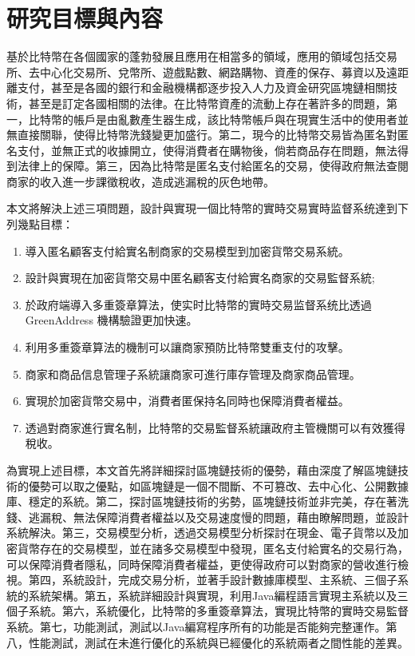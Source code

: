 		

	\section{研究目標與內容}
	基於比特幣在各個國家的蓬勃發展且應用在相當多的領域，應用的領域包括交易所、去中心化交易所、兌幣所、遊戲點數、網路購物、資產的保存、募資以及遠距離支付，甚至是各國的銀行和金融機構都逐步投入人力及資金研究區塊鏈相關技術，甚至是訂定各國相關的法律。在比特幣資產的流動上存在著許多的問題，第一，比特幣的帳戶是由亂數產生器生成，該比特幣帳戶與在現實生活中的使用者並無直接關聯，使得比特幣洗錢變更加盛行。第二，現今的比特幣交易皆為匿名對匿名支付，並無正式的收據開立，使得消費者在購物後，倘若商品存在問題，無法得到法律上的保障。第三，因為比特幣是匿名支付給匿名的交易，使得政府無法查閱商家的收入進一步課徵稅收，造成逃漏稅的灰色地帶。

	本文將解決上述三項問題，設計與實現一個比特幣的實時交易實時监督系统達到下列幾點目標：

		\begin{enumerate}
			\item 導入匿名顧客支付給實名制商家的交易模型到加密貨幣交易系統。
			\item 設計與實現在加密貨幣交易中匿名顧客支付給實名商家的交易監督系統;
			\item 於政府端導入多重簽章算法，使实时比特幣的實時交易监督系统比透過 GreenAddress 機構驗證更加快速。
			\item 利用多重簽章算法的機制可以讓商家預防比特幣雙重支付的攻擊。
			\item 商家和商品信息管理⼦系統讓商家可進行庫存管理及商家商品管理。
			\item 實現於加密貨幣交易中，消費者匿保持名同時也保障消費者權益。
			\item 透過對商家進行實名制，比特幣的交易監督系統讓政府主管機關可以有效獲得稅收。
		\end{enumerate}

	為實現上述目標，本文首先將詳細探討區塊鏈技術的優勢，藉由深度了解區塊鏈技術的優勢可以取之優點，如區塊鏈是一個不間斷、不可篡改、去中心化、公開數據庫、穩定的系統。第二，探討區塊鏈技術的劣勢，區塊鏈技術並非完美，存在著洗錢、逃漏稅、無法保障消費者權益以及交易速度慢的問題，藉由瞭解問題，並設計系統解決。第三，交易模型分析，透過交易模型分析探討在現金、電子貨幣以及加密貨幣存在的交易模型，並在諸多交易模型中發現，匿名支付給實名的交易行為，可以保障消費者隱私，同時保障消費者權益，更使得政府可以對商家的營收進行檢視。第四，系統設計，完成交易分析，並著手設計數據庫模型、主系統、三個子系統的系統架構。第五，系統詳細設計與實現，利用Java編程語言實現主系統以及三個子系統。第六，系統優化，比特幣的多重簽章算法，實現比特幣的實時交易監督系統。第七，功能測試，測試以Java編寫程序所有的功能是否能夠完整運作。第八，性能測試，測試在未進行優化的系統與已經優化的系統兩者之間性能的差異。


